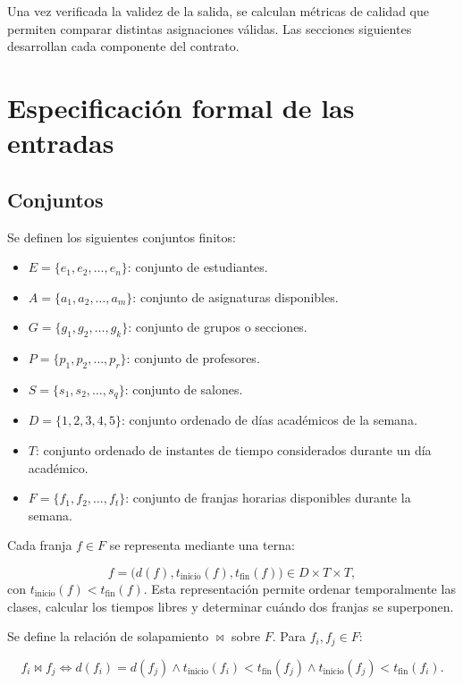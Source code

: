 \documentclass[11pt]{article}
\numberwithin{equation}{section}
\numberwithin{figure}{section}
\numberwithin{table}{section}
\theoremstyle{definition}
\begin{document}
Una vez verificada la validez de la salida, se calculan métricas de calidad que
permiten comparar distintas asignaciones válidas. Las secciones siguientes
desarrollan cada componente del contrato.

\section{Especificación formal de las entradas}

\subsection{Conjuntos}

Se definen los siguientes conjuntos finitos:

\begin{itemize}
  \item $E = \{e_1,e_2,\ldots,e_n\}$: conjunto de estudiantes.
  \item $A = \{a_1,a_2,\ldots,a_m\}$: conjunto de asignaturas disponibles.
  \item $G = \{g_1,g_2,\ldots,g_k\}$: conjunto de grupos o secciones.
  \item $P = \{p_1,p_2,\ldots,p_r\}$: conjunto de profesores.
  \item $S = \{s_1,s_2,\ldots,s_q\}$: conjunto de salones.
  \item $D = \{1,2,3,4,5\}$: conjunto ordenado de días académicos de la
        semana.
  \item $T$: conjunto ordenado de instantes de tiempo considerados durante
        un día académico.
  \item $F = \{f_1,f_2,\ldots,f_t\}$: conjunto de franjas horarias
        disponibles durante la semana.
\end{itemize}

Cada franja $f\in F$ se representa mediante una terna:

\[
f=\bigl(d(f),t_{\mathrm{inicio}}(f),t_{\mathrm{fin}}(f)\bigr)
\in D\times T\times T,
\]
con $t_{\mathrm{inicio}}(f)<t_{\mathrm{fin}}(f)$. Esta representación permite
ordenar temporalmente las clases, calcular los tiempos libres y determinar
cuándo dos franjas se superponen.

Se define la relación de solapamiento $\bowtie$ sobre $F$. Para
$f_i,f_j\in F$:

\[
f_i\bowtie f_j
\iff
d(f_i)=d(f_j)
\land
t_{\mathrm{inicio}}(f_i)<t_{\mathrm{fin}}(f_j)
\land
t_{\mathrm{inicio}}(f_j)<t_{\mathrm{fin}}(f_i).
\]
\end{document}
